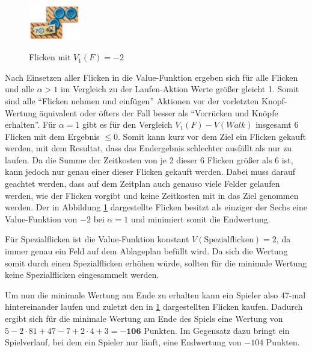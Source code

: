 \begin{figure}
    \vspace*{-0.5cm}
    \centering
    \includegraphics[width=0.2\textwidth]{res/pictures/assets/04-front.png}
    \vspace{-10pt}
    \caption[Flicken mit $V_1\left(F\right) = -2$]{\unskip}
    Flicken mit $V_1\left(F\right) = -2$
    \label{fig:negative-value-patch}
    \vspace*{-0.375cm}
\end{figure}

Nach Einsetzen aller Flicken in die Value-Funktion ergeben sich für alle Flicken und alle $\alpha > 1$ im Vergleich zu der Laufen-Aktion Werte größer gleicht 1. Somit sind alle \enquote{Flicken nehmen und einfügen} Aktionen vor der vorletzten Knopf-Wertung äquivalent oder öfters der Fall besser als \enquote{Vorrücken und Knöpfe erhalten}. Für $\alpha = 1$ gibt es für den Vergleich $ V_1\left(F\right) - V\left(Walk\right)$ insgesamt 6 Flicken mit dem Ergebnis $\le 0$. Somit kann kurz vor dem Ziel ein Flicken gekauft werden, mit dem Resultat, dass das Endergebnis schlechter ausfällt als nur zu laufen. Da die Summe der Zeitkosten von je 2 dieser 6 Flicken größer als 6 ist, kann jedoch nur genau einer dieser Flicken gekauft werden. Dabei muss darauf geachtet werden, dass auf dem Zeitplan auch genauso viele Felder gelaufen werden, wie der Flicken vorgibt und keine Zeitkosten mit in das Ziel genommen werden. Der in Abbildung \ref{fig:negative-value-patch} dargestellte Flicken besitzt als einziger der Sechs eine Value-Funktion von $-2$ bei $\alpha = 1$ und minimiert somit die Endwertung.

Für Spezialflicken ist die Value-Funktion konstant $V\left(\text{Spezialflicken}\right) = 2$, da immer genau ein Feld auf dem Ablageplan befüllt wird. Da sich die Wertung somit durch einen Spezialflicken erhöhen würde, sollten für die minimale Wertung keine Spezialflicken eingesammelt werden.

Um nun die minimale Wertung am Ende zu erhalten kann ein Spieler also 47-mal hintereinander laufen und zuletzt den in \ref{fig:negative-value-patch} dargestellten Flicken kaufen. Dadurch ergibt sich für die minimale Wertung am Ende des Spiels eine Wertung von $5 - 2 \cdot 81 + 47 - 7 + 2 \cdot 4 + 3 = \boldsymbol{-106}$ Punkten. Im Gegensatz dazu bringt ein Spielverlauf, bei dem ein Spieler nur läuft, eine Endwertung von $-104$ Punkten.

